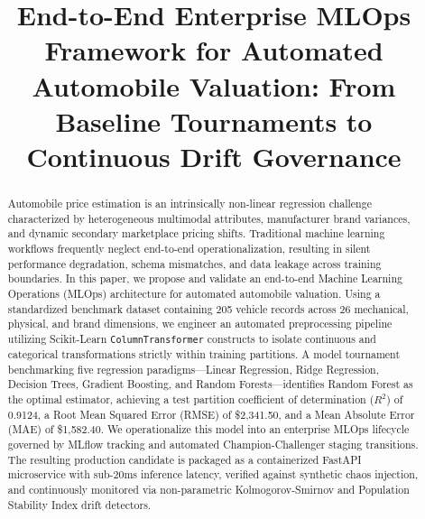 \documentclass[conference]{IEEEtran}
\begin{document}
\title{End-to-End Enterprise MLOps Framework for Automated Automobile Valuation: From Baseline Tournaments to Continuous Drift Governance\\
}

\author{
}

\maketitle

\begin{abstract}
Automobile price estimation is an intrinsically non-linear regression challenge characterized by heterogeneous multimodal attributes, manufacturer brand variances, and dynamic secondary marketplace pricing shifts. Traditional machine learning workflows frequently neglect end-to-end operationalization, resulting in silent performance degradation, schema mismatches, and data leakage across training boundaries. In this paper, we propose and validate an end-to-end Machine Learning Operations (MLOps) architecture for automated automobile valuation. Using a standardized benchmark dataset containing 205 vehicle records across 26 mechanical, physical, and brand dimensions, we engineer an automated preprocessing pipeline utilizing Scikit-Learn \texttt{ColumnTransformer} constructs to isolate continuous and categorical transformations strictly within training partitions. A model tournament benchmarking five regression paradigms—Linear Regression, Ridge Regression, Decision Trees, Gradient Boosting, and Random Forests—identifies Random Forest as the optimal estimator, achieving a test partition coefficient of determination ($R^2$) of 0.9124, a Root Mean Squared Error (RMSE) of \$2,341.50, and a Mean Absolute Error (MAE) of \$1,582.40. We operationalize this model into an enterprise MLOps lifecycle governed by MLflow tracking and automated Champion-Challenger staging transitions. The resulting production candidate is packaged as a containerized FastAPI microservice with sub-20ms inference latency, verified against synthetic chaos injection, and continuously monitored via non-parametric Kolmogorov-Smirnov and Population Stability Index drift detectors.
\end{abstract}
\end{document}
